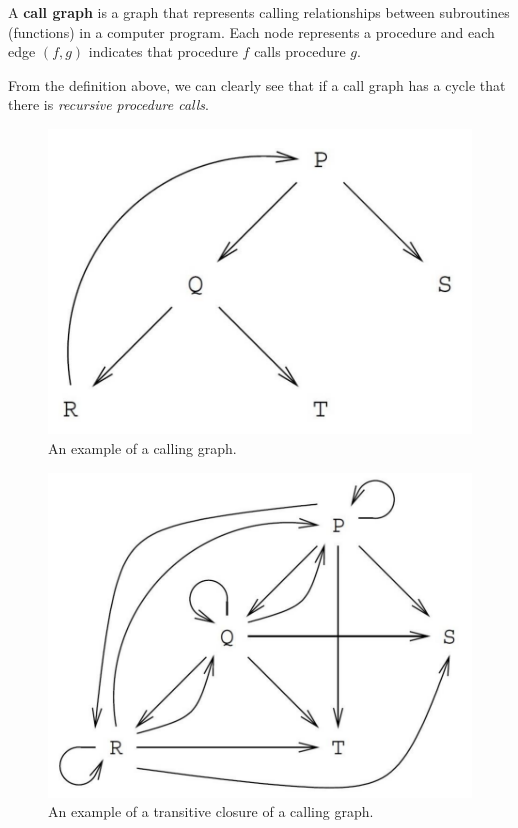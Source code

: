 \begin{definition}
    A \textbf{call graph} is a graph that represents calling
    relationships between subroutines (functions) in a computer
    program.
    Each node represents a procedure and each edge $(f, g)$
    indicates that procedure $f$ calls procedure $g$.
\end{definition}

From the definition above, we can clearly see that if a call graph has
a cycle that there is \emph{recursive procedure calls}.

\begin{figure}[]
    \centering
    \includegraphics[width=0.5\linewidth]{images/calling-graph-1.png}
    \caption{An example of a calling graph.}%
    \label{fig:calling-graph-1}
\end{figure}

\begin{figure}[]
    \centering
    \includegraphics[width=0.5\linewidth]{images/calling-graph-2.png}
    \caption{An example of a transitive closure of a calling graph.}
    \label{fig:calling-graph-2}
\end{figure}

